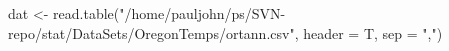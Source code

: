 \begin{Schunk}
\begin{Sinput}
 dat <- read.table("/home/pauljohn/ps/SVN-repo/stat/DataSets/OregonTemps/ortann.csv", 
      header = T, sep = ",")
\end{Sinput}
\end{Schunk}
